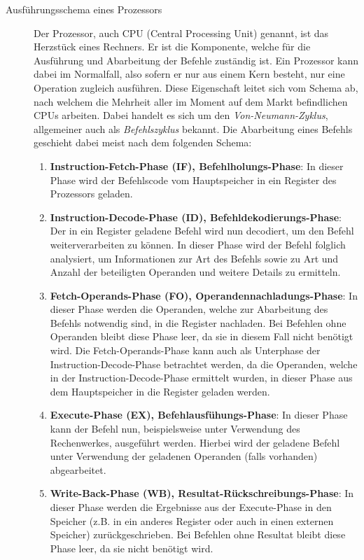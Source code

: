 				\begin{description}
			  		\item[Ausführungsschema eines Prozessors]
						Der Prozessor, auch CPU (Central Processing Unit) genannt, ist das Herzstück eines Rechners. Er ist die Komponente, welche für die Ausführung und Abarbeitung der Befehle zuständig ist. Ein Prozessor kann dabei im Normalfall, also sofern er nur aus einem Kern besteht, nur eine Operation zugleich ausführen. Diese Eigenschaft leitet sich vom Schema ab, nach welchem die Mehrheit aller im Moment auf dem Markt befindlichen CPUs arbeiten. Dabei handelt es sich um den \textit{Von-Neumann-Zyklus}, allgemeiner auch als \textit{Befehlszyklus} bekannt.
						Die Abarbeitung eines Befehls geschieht dabei meist nach dem folgenden Schema:
						
						\begin{enumerate}
							\item \textbf{Instruction-Fetch-Phase (IF), Befehlholungs-Phase}: In dieser Phase wird der Befehlscode vom Hauptspeicher in ein Register des Prozessors geladen.
							\item \textbf{Instruction-Decode-Phase (ID), Befehldekodierungs-Phase}: Der in ein Register geladene Befehl wird nun decodiert, um den Befehl weiterverarbeiten zu können. In dieser Phase wird der Befehl folglich analysiert, um Informationen zur Art des Befehls sowie zu Art und Anzahl der beteiligten Operanden und weitere Details zu ermitteln.
							\item \textbf{Fetch-Operands-Phase (FO), Operandennachladungs-Phase}: In dieser Phase werden die Operanden, welche zur Abarbeitung des Befehls notwendig sind, in die Register nachladen. Bei Befehlen ohne Operanden bleibt diese Phase leer, da sie in diesem Fall nicht benötigt wird. Die Fetch-Operands-Phase kann auch als Unterphase der Instruction-Decode-Phase betrachtet werden, da die Operanden, welche in der Instruction-Decode-Phase ermittelt wurden, in dieser Phase aus dem Hauptspeicher in die Register geladen werden.
							\item \textbf{Execute-Phase (EX), Befehlausfühungs-Phase}: In dieser Phase kann der Befehl nun, beispielsweise unter Verwendung des Rechenwerkes, ausgeführt werden. Hierbei wird der geladene Befehl unter Verwendung der geladenen Operanden (falls vorhanden) abgearbeitet.
							\item \textbf{Write-Back-Phase (WB), Resultat-Rückschreibungs-Phase}: In dieser Phase werden die Ergebnisse aus der Execute-Phase in den Speicher (z.B. in ein anderes Register oder auch in einen externen Speicher) zurückgeschrieben. Bei Befehlen ohne Resultat bleibt diese Phase leer, da sie nicht benötigt wird.
						\end{enumerate}
						

\end{description}
